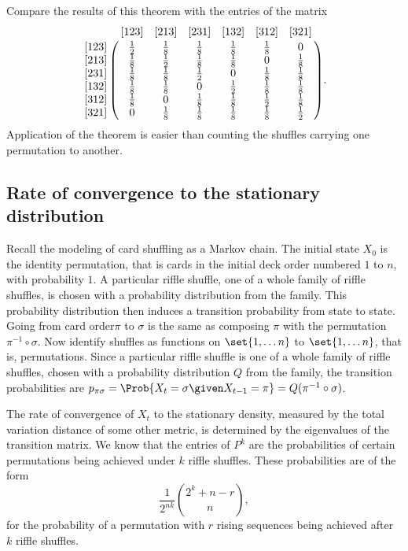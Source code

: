 \documentclass[12pt]{article}
\begin{document}
  \begin{remark}
    Compare the results of this theorem with the entries of the matrix
        \[
        \bordermatrix{  & [123] & [213] & [231] & [132] & [312] & [321]
        \cr
        [123]   & \frac{1}{2}   & \frac{1}{8}   & \frac{1}{8}   & \frac{1}
        {8}     & \frac{1}{8}   & 0 \cr
        [213]   & \frac{1}{8}   & \frac{1}{2}   & \frac{1}{8}   & \frac{1}
        {8}     & 0     & \frac{1}{8} \cr
        [231]   & \frac{1}{8}   & \frac{1}{8}   & \frac{1}{2}   & 0
        & \frac{1}{8}   & \frac{1}{8} \cr
        [132]   & \frac{1}{8}   & \frac{1}{8}   & 0     & \frac{1}{2}
        & \frac{1}{8}   & \frac{1}{8} \cr
        [312]   & \frac{1}{8}   & 0     & \frac{1}{8}   & \frac{1}{8}
        & \frac{1}{2}   & \frac{1}{8} \cr
        [321]   & 0     & \frac{1}{8}   & \frac{1}{8}   & \frac{1}{8}
        & \frac{1}{8}   & \frac{1}{2} \cr
        }.
      \]
     Application of the theorem is easier than counting the
     shuffles carrying one permutation to another. 
  \end{remark}

\subsection*{Rate of convergence to the stationary distribution}

Recall the modeling of card shuffling as a Markov chain.  The initial
state \( X_0 \) is the identity permutation, that is cards in the
initial deck order numbered \( 1 \) to \( n \), with probability \( 1 \).
A particular riffle shuffle, one of a whole family of riffle shuffles,
is chosen with a probability distribution from the family. This
probability distribution then induces a transition probability from
state to state.  Going from card order\( \pi \) to \( \sigma \) is the
same as composing \( \pi \) with the permutation \( \pi^{-1} \circ \sigma \).
Now identify shuffles as functions on \( \set{1, \dots n} \) to \( \set{1,
\dots n} \), that is, permutations.  Since a particular riffle shuffle
is one of a whole family of riffle shuffles, chosen with a probability
distribution \( Q \) from the family, the transition probabilities are \(
p_{\pi \sigma} = \Prob{X_t = \sigma \given X_{t-1} = \pi} = Q(\pi^{-1} \circ
\sigma) \).

The rate of convergence of \( X_t \) to the stationary density, measured
by the total variation distance of some other metric, is determined by
the eigenvalues of the transition matrix.  We know that the entries of \(
P^k \) are the probabilities of certain permutations being achieved
under \( k \) riffle shuffles.  These probabilities are of the form
\[
    \frac{1}{2^{nk}} \binom{2^k +n - r}{n},
\] for the probability of a permutation with \( r \) rising sequences
being achieved after \( k \) riffle shuffles.
\end{document}
